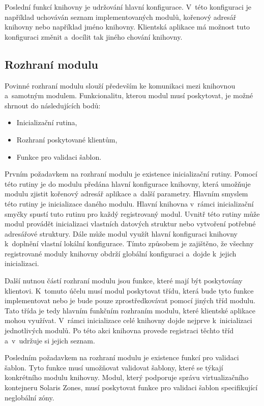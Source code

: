 Poslední funkcí knihovny je udržování hlavní konfigurace. V~této konfiguraci je například uchováván seznam implementovaných
modulů, kořenový adresář knihovny nebo například jméno knihovny. Klientská aplikace má možnost tuto konfiguraci změnit
a~docílit tak jiného chování knihovny.
\subsection{Rozhraní modulu}
\label{chapter:implementation:library:interface}
Povinné rozhraní modulu slouží především ke komunikaci mezi knihovnou a~samotným modulem. Funkcionalitu, kterou modul
musí poskytovat, je možné shrnout do následujících bodů:
\begin{itemize}
 \item Inicializační rutina,
 \item Rozhraní poskytované klientům,
 \item Funkce pro validaci šablon.
\end{itemize}
Prvním požadavkem na rozhraní modulu je existence inicializační rutiny. Pomocí této rutiny je do modulu předána hlavní
konfigurace knihovny, která umožňuje modulu zjistit kořenový adresář aplikace a~další parametry. Hlavním smyslem
této rutiny je inicializace daného modulu. Hlavní knihovna v~rámci inicializační smyčky spustí tuto rutinu pro každý
registrovaný modul. Uvnitř této rutiny může modul provádět inicializaci vlastních datových struktur nebo vytvoření potřebné
adresářové struktury. Dále může modul využít hlavní konfiguraci knihovny k~doplnění vlastní lokální konfigurace. Tímto způsobem
je zajištěno, že všechny registrované moduly knihovny obdrží globální konfiguraci a~dojde k~jejich inicializaci.

Další nutnou částí rozhraní modulu jsou funkce, které mají být poskytovány klientovi. K~tomuto účelu musí modul poskytovat
třídu, která bude tyto funkce implementovat nebo je bude pouze zprostředkovávat pomocí jiných tříd modulu. Tato třída je tedy
hlavním funkčním rozhraním modulu, které klientské aplikace mohou využívat. V~rámci inicializace celé knihovny dojde nejprve
k~inicializaci jednotlivých modulů. Po této akci knihovna provede registraci těchto tříd a~v~udržuje si jejich seznam.

Posledním požadavkem na rozhraní modulu je existence funkcí pro validaci šablon. Tyto funkce musí umožňovat validovat šablony,
které se týkají konkrétního modulu knihovny. Modul, který podporuje správu virtualizačního kontejneru Solaris Zones, musí poskytovat
funkce pro validaci šablon specifikující neglobální zóny.

